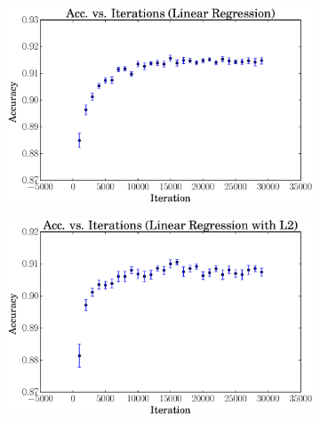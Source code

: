 \documentclass[a4paper, 12pt]{article}
\begin{document}
\begin{figure}[htpb]
    \centering
    \begin{subfigure}[htpb]{0.45\textwidth}
        \includegraphics[width=\textwidth]{acc_vs_iterations_linreg}
        \caption{}
        \label{fig:snt}
    \end{subfigure}
    \begin{subfigure}[htpb]{0.45\textwidth}
        \includegraphics[width=\textwidth]{acc_vs_iterations_linregL2}
        \caption{}
        \label{fig:ret}
    \end{subfigure}
    \hfill %
    \begin{subfigure}[htpb]{0.45\textwidth}

\end{subfigure}
\end{figure}
\end{document}
